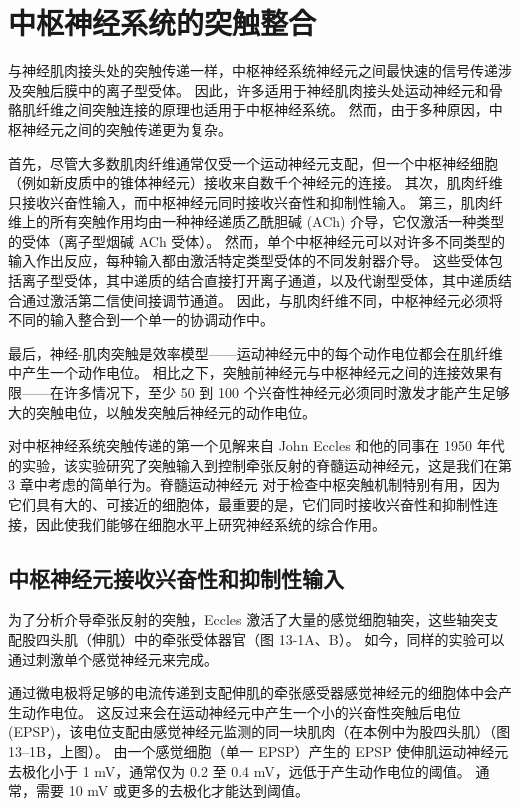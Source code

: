 \chapter{中枢神经系统的突触整合} \label{chap:chap13}
与神经肌肉接头处的突触传递一样，中枢神经系统神经元之间最快速的信号传递涉及突触后膜中的离子型受体。 因此，许多适用于神经肌肉接头处运动神经元和骨骼肌纤维之间突触连接的原理也适用于中枢神经系统。 然而，由于多种原因，中枢神经元之间的突触传递更为复杂。

首先，尽管大多数肌肉纤维通常仅受一个运动神经元支配，但一个中枢神经细胞（例如新皮质中的锥体神经元）接收来自数千个神经元的连接。 其次，肌肉纤维只接收兴奋性输入，而中枢神经元同时接收兴奋性和抑制性输入。 第三，肌肉纤维上的所有突触作用均由一种神经递质乙酰胆碱 (ACh) 介导，它仅激活一种类型的受体（离子型烟碱 ACh 受体）。 然而，单个中枢神经元可以对许多不同类型的输入作出反应，每种输入都由激活特定类型受体的不同发射器介导。 这些受体包括离子型受体，其中递质的结合直接打开离子通道，以及代谢型受体，其中递质结合通过激活第二信使间接调节通道。 因此，与肌肉纤维不同，中枢神经元必须将不同的输入整合到一个单一的协调动作中。

最后，神经-肌肉突触是效率模型——运动神经元中的每个动作电位都会在肌纤维中产生一个动作电位。 相比之下，突触前神经元与中枢神经元之间的连接效果有限——在许多情况下，至少 50 到 100 个兴奋性神经元必须同时激发才能产生足够大的突触电位，以触发突触后神经元的动作电位。

对中枢神经系统突触传递的第一个见解来自 John Eccles 和他的同事在 1950 年代的实验，该实验研究了突触输入到控制牵张反射的脊髓运动神经元，这是我们在第 3 章中考虑的简单行为。脊髓运动神经元 对于检查中枢突触机制特别有用，因为它们具有大的、可接近的细胞体，最重要的是，它们同时接收兴奋性和抑制性连接，因此使我们能够在细胞水平上研究神经系统的综合作用。

\section{中枢神经元接收兴奋性和抑制性输入}
为了分析介导牵张反射的突触，Eccles 激活了大量的感觉细胞轴突，这些轴突支配股四头肌（伸肌）中的牵张受体器官（图 13-1A、B）。 如今，同样的实验可以通过刺激单个感觉神经元来完成。

通过微电极将足够的电流传递到支配伸肌的牵张感受器感觉神经元的细胞体中会产生动作电位。 这反过来会在运动神经元中产生一个小的兴奋性突触后电位 (EPSP)，该电位支配由感觉神经元监测的同一块肌肉（在本例中为股四头肌）（图 13–1B，上图）。 由一个感觉细胞（单一 EPSP）产生的 EPSP 使伸肌运动神经元去极化小于 1 mV，通常仅为 0.2 至 0.4 mV，远低于产生动作电位的阈值。 通常，需要 10 mV 或更多的去极化才能达到阈值。

